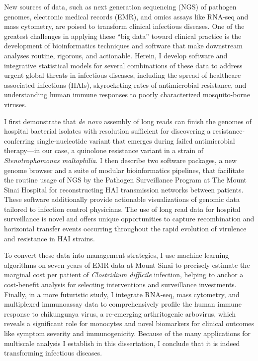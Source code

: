 
\noindent{}New sources of data, such as next generation sequencing (NGS) of pathogen ge\-nomes, electronic medical records (EMR), and omics assays like RNA-seq and mass cytometry, are poised to transform clinical infectious diseases. One of the greatest challenges in applying these ``big data'' toward clinical practice is the development of bioinformatics techniques and software that make downstream analyses routine, rigorous, and actionable. Herein, I develop software and integrative statistical models for several combinations of these data to address urgent global threats in infectious diseases, including the spread of healthcare associated infections (HAIs), skyrocketing rates of antimicrobial resistance, and understanding human immune responses to poorly characterized mosquito-borne viruses.

I first demonstrate that \emph{de novo} assembly of long reads can finish the genomes of hospital bacterial isolates with  resolution sufficient for discovering a resistance-conferring sin\-gle-\allowbreak nu\-cle\-o\-tide variant that emerges during failed antimicrobial the\-ra\-py—in our case, a quinolone resistance variant in a strain of \emph{Stenotrophomonas maltophilia}. I then describe two software packages, a new genome browser and a suite of modular bioinformatics pipelines, that facilitate the routine usage of NGS by the Pathogen Surveillance Program at The Mount Sinai Hospital for reconstructing HAI transmission networks between patients. These software additionally provide actionable visualizations of genomic data tailored to infection control physicians. The use of long read data for hospital surveillance is novel and offers unique opportunities to capture recombination and horizontal transfer events occurring throughout the rapid evolution of virulence and resistance in HAI strains. 

To convert these data into management strategies, I use machine learning algorithms on seven years of EMR data at Mount Sinai to precisely estimate the marginal cost per patient of \emph{Clostridium difficile} infection, helping to anchor a cost-benefit analysis for selecting interventions and surveillance investments. Finally, in a more futuristic study, I integrate RNA-seq, mass cytometry, and multiplexed immunoassay data to comprehensively profile the human immune response to chikungunya virus, a re-emerging arthritogenic arbovirus, which reveals a significant role for monocytes and novel biomarkers for clinical outcomes like symptom severity and immunogenicity. Because of the many applications for multiscale analysis I establish in this dissertation, I conclude that it is indeed transforming infectious diseases.